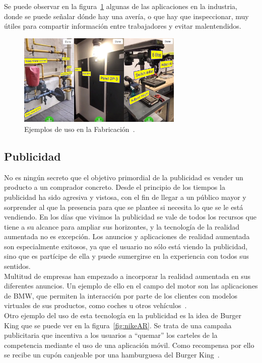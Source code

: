 Se puede observar en la figura~\ref{fig:placenote} algunas de las aplicaciones en la industria, donde se puede señalar dónde hay una avería, o que hay que inspeccionar, muy útiles para compartir información entre trabajadores y evitar malentendidos.

\begin{figure}[H]
     \centering
     \includegraphics[width=0.7\textwidth]{Images/Placenote.jpg}
     \caption[Ejemplos de uso en la Fabricación]{Ejemplos de uso en la Fabricación~\cite{PlacenoteYT}.}
     \label{fig:placenote}
 \end{figure}
 
\subsection{Publicidad}
No es ningún secreto que el objetivo primordial de la publicidad es vender un producto a un comprador concreto. Desde el principio de los tiempos la publicidad ha sido agresiva y vistosa, con el fin de llegar a un público mayor y sorprender al que la presencia para que se plantee si necesita lo que se le está vendiendo. En los días que vivimos la publicidad se vale de todos los recursos que tiene a su alcance para ampliar sus horizontes, y la tecnología de la realidad aumentada no es excepción. Los anuncios y aplicaciones de realidad aumentada son especialmente exitosos, ya que el usuario no sólo está viendo la publicidad, sino que es partícipe de ella y puede sumergirse en la experiencia con todos sus sentidos.\\

Multitud de empresas han empezado a incorporar la realidad aumentada en sus diferentes anuncios. Un ejemplo de ello en el campo del motor son las aplicaciones de BMW, que permiten la interacción por parte de los clientes con modelos virtuales de sus productos, como coches u otros vehículos~\cite{Neosentec_Pub}.\\

Otro ejemplo del uso de esta tecnología en la publicidad es la idea de Burger King que se puede ver en la figura~\ref{fig:nikeAR}. Se trata de una campaña publicitaria que incentiva a los usuarios a “quemar” los carteles de la competencia mediante el uso de una aplicación móvil. Como recompensa por ello se recibe un cupón canjeable por una hamburguesa del Burger King~\cite{Designboom}.


